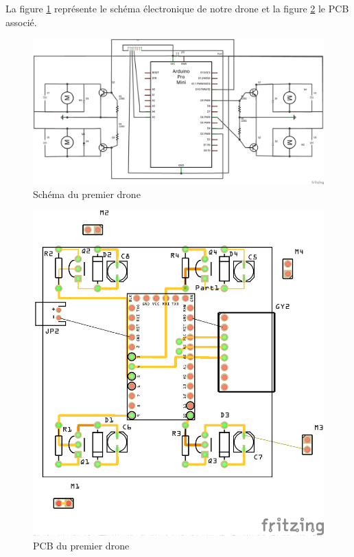 \documentclass[a4paper,10pt]{report}
\begin{document}
      La figure \ref{schema1drone} représente le schéma électronique de notre drone et la figure \ref{pcb1drone} le PCB associé.
      
      \begin{figure}[htbp]%
	\centering
	\includegraphics[scale = 0.3]{img/drone1_circuit_schema.png}
	\caption{Schéma du premier drone}
	\label{schema1drone}
      \end{figure}
      
      \begin{figure}[htbp]%
	\centering
	\includegraphics[scale = 0.8]{img/drone1_circuit_pcb.png}
	\caption{PCB du premier drone}
	\label{pcb1drone}
      \end{figure}
      
\end{document}
